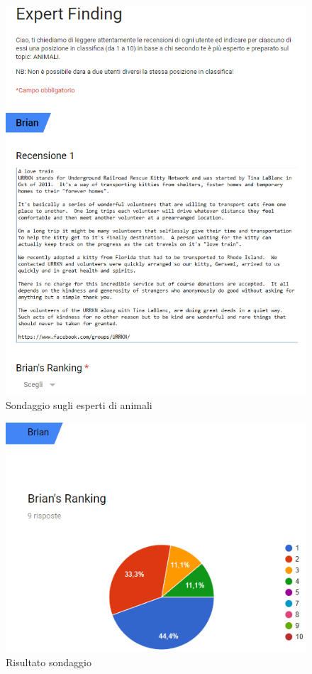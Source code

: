\begin{figure}[H]
	\centering
	\includegraphics[scale=0.5]{image/form.PNG}
	\caption{Sondaggio sugli esperti di animali}
	\label{fig:frm}
\end{figure}

\begin{figure}[H]
	\centering
	\includegraphics[scale=0.7]{image/sond.PNG}
	\caption{Risultato sondaggio}
	\label{fig:snd}
\end{figure}

